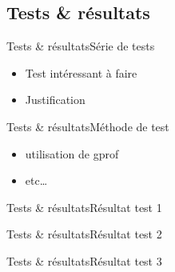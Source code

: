 \subsection{Tests \& résultats}
\begin{frame}{Tests \& résultats}{Série de tests}
\begin{itemize}
\item Test intéressant à faire
\item Justification
\end{itemize}
\end{frame}

\begin{frame}{Tests \& résultats}{Méthode de test}
\begin{itemize}
\item utilisation de gprof
\item etc\ldots
\end{itemize}
\end{frame}

\begin{frame}{Tests \& résultats}{Résultat test 1}
\end{frame}

\begin{frame}{Tests \& résultats}{Résultat test 2}
\end{frame}

\begin{frame}{Tests \& résultats}{Résultat test 3}
\end{frame}
